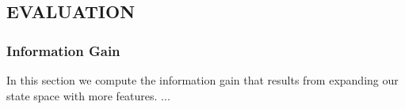 \documentclass[]{article}
\begin{document}


\subsection{EVALUATION}

\subsubsection{Information Gain}

In this section we compute the information gain that results from expanding our state space with more features. ...

\begin{table}[htb]
\caption{Model Entropy}
\label{table:model-entropy}
\begin{center}
\end{center}
\end{table}
\end{document}
